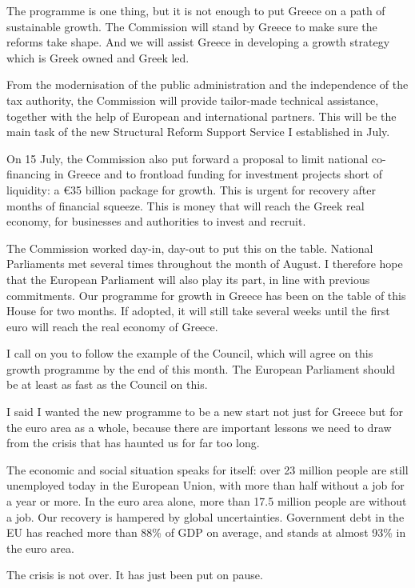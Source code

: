 \documentclass[a4paper,11pt]{article}
\begin{document}
The programme is one thing, but it is not enough to put Greece on a path of sustainable growth. The Commission will stand by Greece to make sure the reforms take shape. And we will assist Greece in developing a growth strategy which is Greek owned and Greek led.

From the modernisation of the public administration and the independence of the tax authority, the Commission will provide tailor-made technical assistance, together with the help of European and international partners. This will be the main task of the new Structural Reform Support Service I established in July.

On 15 July, the Commission also put forward a proposal to limit national co-financing in Greece and to frontload funding for investment projects short of liquidity: a \euro35 billion package for growth. This is urgent for recovery after months of financial squeeze. This is money that will reach the Greek real economy, for businesses and authorities to invest and recruit.

The Commission worked day-in, day-out to put this on the table. National Parliaments met several times throughout the month of August. I therefore hope that the European Parliament will also play its part, in line with previous commitments. Our programme for growth in Greece has been on the table of this House for two months. If adopted, it will still take several weeks until the first euro will reach the real economy of Greece.

I call on you to follow the example of the Council, which will agree on this growth programme by the end of this month. The European Parliament should be at least as fast as the Council on this.

 

I said I wanted the new programme to be a new start not just for Greece but for the euro area as a whole, because there are important lessons we need to draw from the crisis that has haunted us for far too long.

The economic and social situation speaks for itself: over 23 million people are still unemployed today in the European Union, with more than half without a job for a year or more. In the euro area alone, more than 17.5 million people are without a job. Our recovery is hampered by global uncertainties. Government debt in the EU has reached more than 88\% of GDP on average, and stands at almost 93\% in the euro area.

The crisis is not over. It has just been put on pause.
\end{document}
